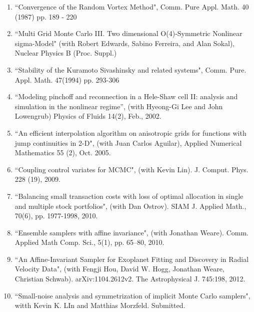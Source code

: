 \documentclass[10pt]{article}
\newcommand{\heading}[1]{\par\noindent{\normalsize\bf{#1}}\par}
\begin{document}
\vspace*{.1in}
\heading{Publications (a selection)}
\vspace*{-.1in}
\begin{enumerate}

\item
``Convergence of the Random Vortex Method", Comm. Pure Appl. Math.
40 (1987) pp. 189 - 220

\item
``Multi Grid Monte Carlo III. Two dimensional O(4)-Symmetric Nonlinear 
sigma-Model"
(with Robert Edwards, Sabino Ferreira, and Alan Sokal), 
Nuclear Physics B (Proc. Suppl.)
\item
``Stability of the Kuramoto Sivashinsky and related systems",  
Comm. Pure. Appl. Math. 47(1994) pp. 293-306

\item
``Modeling pinchoff and reconnection in a Hele-Shaw cell II: analysis
and simulation in the nonlinear regime'', (with Hyeong-Gi Lee and John 
Lowengrub) Physics of Fluids 14(2), Feb., 2002.

\item
``An efficient interpolation
algorithm on anisotropic grids for functions with jump continuities in
2-D", (with Juan Carlos Aguilar), Applied Numerical Mathematics 55 (2), Oct.
2005.

\item
``Coupling control variates for MCMC", (with Kevin Lin). J. Comput. Phys.
228 (19), 2009.
\item
``Balancing small transaction costs with loss of optimal allocation
in single and multiple stock portfolios", (with Dan Ostrov). 
SIAM J. Applied Math., 70(6), pp. 1977-1998, 2010.
\item
``Ensemble samplers with affine invariance", (with Jonathan Weare).
Comm. Applied Math Comp. Sci., 5(1), pp. 65--80, 2010.
\item
``An Affine-Invariant Sampler for Exoplanet Fitting and Discovery in
Radial Velocity Data", (with Fengji Hou, David W. Hogg, Jonathan Weare,
Christian Schwab).  arXiv:1104.2612v2. The Astrophysical J. 745:198, 2012.

\item
``Small-noise analysis and symmetrization of implicit Monte Carlo
samplers", witth Kevin K. LIn and Matthias Morzfeld.  Submitted.


\end{enumerate}
\end{document}
